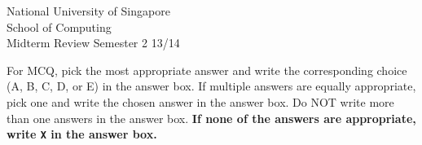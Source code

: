 \documentclass[a4paper,11pt,answers]{exam}
\begin{document}
    \extraheadheight{.5in}
    {\large\sf National University of Singapore\\ School of Computing \\
    \LARGE\sf Midterm Review}%
    {\large\sf Semester 2 13/14}
    \firstpageheadrule
    \pagestyle{headandfoot}

\newcommand{\answerbox}{\hfill\textbf{Answer:\ \ }\begin{picture}(0.9,0.9) \framebox(0.9,0.9)[r]{}              \end{picture}}

\newcommand{\textfield}[1]{Answer:\\[4pt]\begin{picture}(15,#1)\framebox(15,#1)[r]{}\end{picture}\vspace{4pt}}

\textsf{For MCQ, pick the most appropriate answer and write the corresponding choice (A, B, C, D, or E) in the answer box.  If multiple answers are equally appropriate, pick one and
write the chosen answer in the answer box.  Do NOT write more than one 
answers in the answer box.  \textbf{If none of the answers are appropriate, write \texttt{X} in the answer box.}}

%
\end{document}
